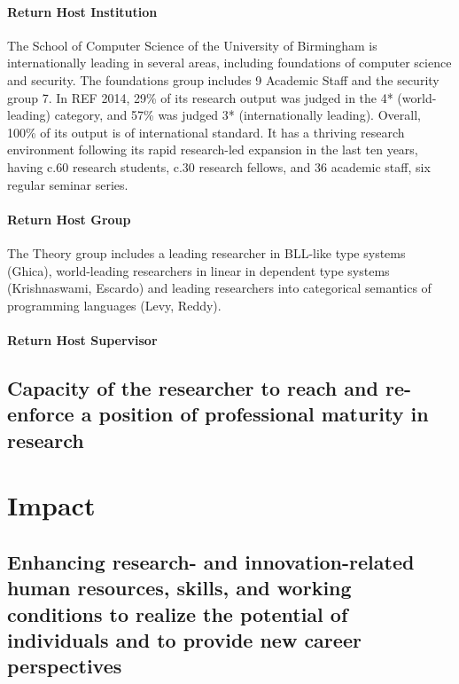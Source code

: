 \documentclass{article}[11pt]
\begin{document}
\paragraph{Return Host Institution}
The School of Computer Science of the University of Birmingham is
internationally leading in several areas, including foundations of
computer science and security. The foundations group includes 9
Academic Staff and the security group 7. In REF 2014, 29\% of its
research output was judged in the 4* (world-leading) category, and
57\% was judged 3* (internationally leading). Overall, 100\% of its
output is of international standard. It has a thriving research
environment following its rapid research-led expansion in the last ten
years, having c.60 research students, c.30 research fellows, and 36
academic staff, six regular seminar series.


\paragraph{Return Host Group}
The Theory group includes a leading researcher in BLL-like type systems (Ghica), world-leading
researchers in linear in dependent type systems (Krishnaswami, Escardo) and
leading researchers into categorical semantics of programming languages (Levy, Reddy).


\paragraph{Return Host Supervisor}


\subsection{Capacity of the researcher to reach and re-enforce a position of professional maturity in research}



\section{Impact}
\subsection{Enhancing research- and innovation-related human resources, skills, and working conditions to realize the potential of individuals and to provide new career perspectives}
\end{document}
